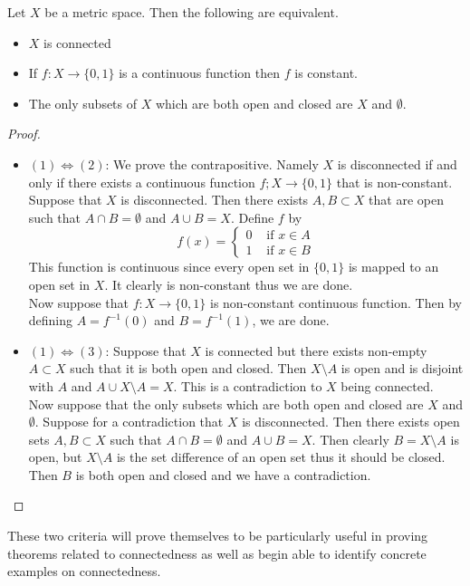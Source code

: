 \documentclass[a4paper]{article}
\begin{document}
\begin{prp}{}{} Let $X$ be a metric space. Then the following are equivalent. 
\begin{itemize}
\item $X$ is connected
\item If $f:X\to\{0,1\}$ is a continuous function then $f$ is constant. 
\item The only subsets of $X$ which are both open and closed are $X$ and $\emptyset$. 
\end{itemize} 
\begin{proof}~\\
\begin{itemize}
\item $(1)\iff(2)$: We prove the contrapositive. Namely $X$ is disconnected if and only if there exists a continuous function $f;X\to\{0,1\}$ that is non-constant. Suppose that $X$ is disconnected. Then there exists $A,B\subset X$ that are open such that $A\cap B=\emptyset$ and $A\cup B=X$. Define $f$ by $$f(x)=\begin{cases}
0 & \text{ if }x\in A\\
1 & \text{ if }x\in B
\end{cases}$$
This function is continuous since every open set in $\{0,1\}$ is mapped to an open set in $X$. It clearly is non-constant thus we are done. \\
Now suppose that $f:X\to\{0,1\}$ is non-constant continuous function. Then by defining $A=f^{-1}(0)$ and $B=f^{-1}(1)$, we are done. 
\item $(1)\iff(3)$: Suppose that $X$ is connected but there exists non-empty $A\subset X$ such that it is both open and closed. Then $X\setminus A$ is open and is disjoint with $A$ and $A\cup X\setminus A=X$. This is a contradiction to $X$ being connected. \\
Now suppose that the only subsets which are both open and closed are $X$ and $\emptyset$. Suppose for a contradiction that $X$ is disconnected. Then there exists open sets $A,B\subset X$ such that $A\cap B=\emptyset$ and $A\cup B=X$. Then clearly $B=X\setminus A$ is open, but $X\setminus A$ is the set difference of an open set thus it should be closed. Then $B$ is both open and closed and we have a contradiction. 
\end{itemize}
\end{proof}
\end{prp}

These two criteria will prove themselves to be particularly useful in proving theorems related to connectedness as well as begin able to identify concrete examples on connectedness. 
\end{document}
